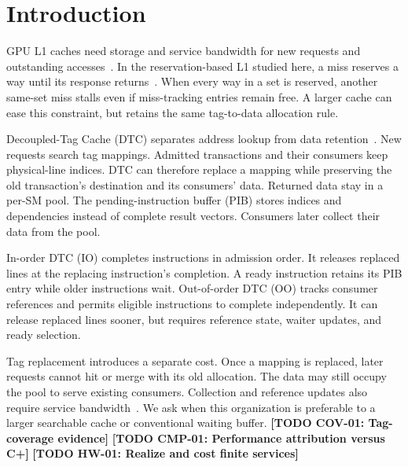 \providecommand{\dtctodo}[2]{\textbf{[TODO #1: #2]}}
\section{Introduction}
GPU L1 caches need storage and service bandwidth for new requests and outstanding accesses~\cite{kroft,hierarchical_mha,bandwidth}.
In the reservation-based L1 studied here, a miss reserves a way until its response returns~\cite{li2015}.
When every way in a set is reserved, another same-set miss stalls even if miss-tracking entries remain free.
A larger cache can ease this constraint, but retains the same tag-to-data allocation rule.

Decoupled-Tag Cache (DTC) separates address lookup from data retention~\cite{zhao2024}.
New requests search tag mappings.
Admitted transactions and their consumers keep physical-line indices.
DTC can therefore replace a mapping while preserving the old transaction's destination and its consumers' data.
Returned data stay in a per-SM pool.
The pending-instruction buffer (PIB) stores indices and dependencies instead of complete result vectors.
Consumers later collect their data from the pool.

In-order DTC (IO) completes instructions in admission order.
It releases replaced lines at the replacing instruction's completion.
A ready instruction retains its PIB entry while older instructions wait.
Out-of-order DTC (OO) tracks consumer references and permits eligible instructions to complete independently.
It can release replaced lines sooner, but requires reference state, waiter updates, and ready selection.

Tag replacement introduces a separate cost.
Once a mapping is replaced, later requests cannot hit or merge with its old allocation.
The data may still occupy the pool to serve existing consumers.
Collection and reference updates also require service bandwidth~\cite{dtc-artifact}.
We ask when this organization is preferable to a larger searchable cache or conventional waiting buffer.
\dtctodo{COV-01}{Tag-coverage evidence}
\dtctodo{CMP-01}{Performance attribution versus C+}
\dtctodo{HW-01}{Realize and cost finite services}

